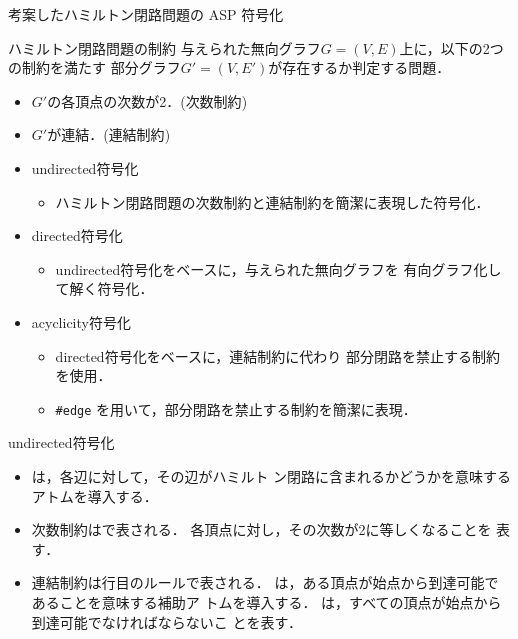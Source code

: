 \documentclass[dvipdfmx,10pt]{beamer}
\begin{document}
\begin{frame}{考案したハミルトン閉路問題の ASP 符号化}
  \begin{block}{ハミルトン閉路問題の制約}
    与えられた無向グラフ$G= (V,E)$上に，以下の2つの制約を満たす
    部分グラフ$G'= (V,E')$が存在するか判定する問題．
    \begin{itemize}
    \item $G'$の各頂点の次数が2．(\alert{次数制約})
    \item $G'$が連結．(\alert{連結制約})
    \end{itemize}
  \end{block}
  \begin{itemize}
  \item \alert{\textsf{undirected}符号化}
    \begin{itemize}
    \item ハミルトン閉路問題の次数制約と連結制約を簡潔に表現した符号化．
    \end{itemize}
  \item \alert{\textsf{directed}符号化}
    \begin{itemize}
    \item \textsf{undirected}符号化をベースに，与えられた無向グラフを
      有向グラフ化して解く符号化．
    \end{itemize}
  \item \alert{\textsf{acyclicity}符号化}
    \begin{itemize}
    \item \textsf{directed}符号化をベースに，連結制約に代わり
      部分閉路を禁止する制約を使用．
      \item \texttt{\#edge} を用いて，部分閉路を禁止する制約を簡潔に表現．
    \end{itemize}
  \end{itemize}
\end{frame}
\begin{frame}{\textsf{undirected}符号化}
\begin{exampleblock}{}

\end{exampleblock}
\begin{itemize}
\item {}は，各辺に対して，その辺がハミルト
      ン閉路に含まれるかどうかを意味するアトムを導入する．
\item 次数制約はで表される．
      各頂点に対し，その次数が2に等しくなることを
      表す．
\item 連結制約は行目のルールで表される．
      は，ある頂点が始点から到達可能であることを意味する補助ア
      トムを導入する．
      は，すべての頂点が始点から到達可能でなければならないこ
      とを表す．
\end{itemize}
\end{frame}
\end{document}
